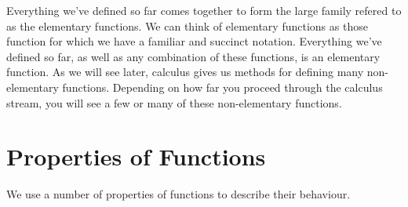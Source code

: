 \documentclass[fleqn]{report}
\begin{document}
Everything we've defined so far comes together to form the
large family refered to as the elementary functions. We can think
of elementary functions as those function for which we have a
familiar and succinct notation. Everything we've defined so far,
as well as any combination of these functions, is an
elementary function. As we will see later, calculus gives us
methods for defining many non-elementary functions. Depending
on how far you proceed through the calculus stream, you will
see a few or many of these non-elementary functions.

\section{Properties of Functions}
\label{properties-of-functions}

We use a number of properties of functions to describe their
behaviour.
\end{document}
